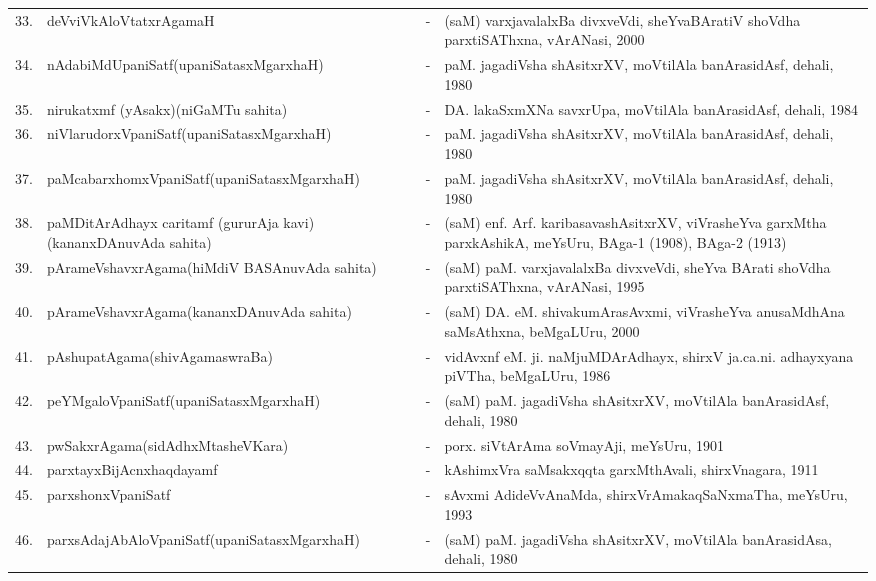 {\begin{longtable}{rp{6cm}cp{9cm}<{\raggedright}@{}}
33. & deVviVkAloVtatxrAgamaH &-& (saM) varxjavalalxBa divxveVdi, sheYvaBAratiV shoVdha parxtiSAThxna, vArANasi, 2000\\
34. & nAdabiMdUpaniSatf\newline (upaniSatasxMgarxhaH) &-& paM. jagadiVsha shAsitxrXV, moVtilAla banArasidAsf, dehali, 1980\\
35. & nirukatxmf (yAsakx)\newline (niGaMTu sahita) &-& DA. lakaSxmXNa savxrUpa, moVtilAla banArasidAsf, dehali, 1984\\
36. & niVlarudorxVpaniSatf\newline (upaniSatasxMgarxhaH) &-& paM. jagadiVsha shAsitxrXV, moVtilAla banArasidAsf, dehali, 1980\\
37. & paMcabarxhomxVpaniSatf\newline (upaniSatasxMgarxhaH) &-& paM. jagadiVsha shAsitxrXV, moVtilAla banArasidAsf, dehali, 1980\\
38. & paMDitArAdhayx caritamf (gururAja kavi)\newline (kananxDAnuvAda sahita) &-& (saM) enf. Arf. karibasavashAsitxrXV, viVrasheYva garxMtha parxkAshikA, meYsUru, BAga-1 (1908), BAga-2 (1913)\\
39. & pArameVshavxrAgama\newline (hiMdiV BASAnuvAda sahita) &-& (saM) paM. varxjavalalxBa divxveVdi, sheYva BArati shoVdha parxtiSAThxna, vArANasi, 1995\\
40. & pArameVshavxrAgama\newline (kananxDAnuvAda sahita) &-& (saM) DA. eM. shivakumArasAvxmi, viVrasheYva anusaMdhAna saMsAthxna, beMgaLUru, 2000\\
41. & pAshupatAgama\newline (shivAgamaswraBa) &-& vidAvxnf eM. ji. naMjuMDArAdhayx, shirxV ja.ca.ni. adhayxyana piVTha, beMgaLUru, 1986\\
42. & peYMgaloVpaniSatf\newline (upaniSatasxMgarxhaH) &-& (saM) paM. jagadiVsha shAsitxrXV, moVtilAla banArasidAsf, dehali, 1980\\
43. & pwSakxrAgama\newline (sidAdhxMtasheVKara) &-& porx. siVtArAma soVmayAji, meYsUru, 1901\\
44. & parxtayxBijAcnxhaqdayamf &-& kAshimxVra saMsakxqqta garxMthAvali, shirxVnagara, 1911\\
45. & parxshonxVpaniSatf &-& sAvxmi AdideVvAnaMda, shirxVrAmakaqSaNxmaTha, meYsUru, 1993\\
46. & parxsAdajAbAloVpaniSatf\newline (upaniSatasxMgarxhaH) &-& (saM) paM. jagadiVsha shAsitxrXV, moVtilAla banArasidAsa, dehali, 1980\\

\end{longtable}}
